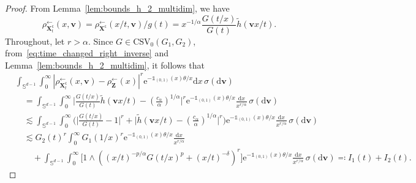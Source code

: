 \documentclass[en,oneside,bbfont,article]{amsart}
\theoremstyle{remark}
\theoremstyle{definition}
\theoremstyle{definition}
\newcommand\Sp{\mathbb{S}}
\newcommand\e{\mathord{\mathrm{e}}}
\newcommand\1{\mathds{1}}
\newcommand\CSV{\mathrm{CSV}}
\newcommand\la{\leftarrow}
\newcommand\co{\mathsf{c}}
\newcommand{\D}{\mathrm{d}}
\newcommand{\wt}[1]{\widetilde{#1}}
\begin{document}
\begin{proof} 
From Lemma~\ref{lem:bounds_h_2_multidim}, we have
\begin{equation}\label{eq:time_changed_right_inverse}
\rho_{\bm{X}_t^\co}^{\la}(x,\bm{v})
=\rho_{\bm{X}^\co}^{\la}(x/t,\bm{v})/g(t)
=x^{-1/\alpha} \frac{G(t/x)}{G(t)}\wt h(\bm{v} x/t).
\end{equation}
Throughout, let $r>\alpha$. Since $G \in \CSV_0(G_1,G_2)$, from~\eqref{eq:time_changed_right_inverse} and Lemma~\ref{lem:bounds_h_2_multidim}, it follows that
\begin{align*}
    &\int_{\Sp^{d-1}}\int_0^\infty
|\rho_{\bm{X}_t^\co}^{\la}(x,\bm{v})-\rho_{\bm{Z}}^{\la}(x)|^r \e^{-\1_{(0,1)}(x)\theta /x} \D x \, \sigma(\D \bm{v})\\
&\quad = \int_{\Sp^{d-1}}\int_0^\infty
\bigg|\frac{G(t/x)}{G(t)}\wt h(\bm{v} x/t)-\left(\frac{c_\alpha}{\alpha} \right)^{1/\alpha} \bigg|^r \e^{-\1_{(0,1)}(x)\theta /x} \frac{\D x}{x^{r/\alpha}} \, \sigma(\D \bm{v})\\
&\quad \lesssim \int_{\Sp^{d-1}}\int_0^\infty \bigg(
\bigg|\frac{G(t/x)}{G(t)}-1\bigg|^r+\bigg|\wt h(\bm{v} x/t)-\left(\frac{c_\alpha}{\alpha} \right)^{1/\alpha} \bigg|^r \bigg)\e^{-\1_{(0,1)}(x)\theta /x} \frac{\D x}{x^{r/\alpha}} \, \sigma(\D \bm{v})\\
&\quad \lesssim G_2(t)^r \int_0^\infty 
G_1(1/x)^r\e^{-\1_{(0,1)}(x)\theta /x}\frac{\D x}{x^{r/\alpha}} \\
&\qquad + \int_{\Sp^{d-1}}\int_0^\infty \big[1\wedge ((x/t)^{- p/\alpha}G(t/x)^{p}+(x/t)^{-\delta})^r\big] \e^{-\1_{(0,1)}(x)\theta /x} \frac{\D x}{x^{r/\alpha}} \, \sigma(\D \bm{v})\eqqcolon I_1(t)+I_2(t).
\end{align*}


\end{proof}
\end{document}
